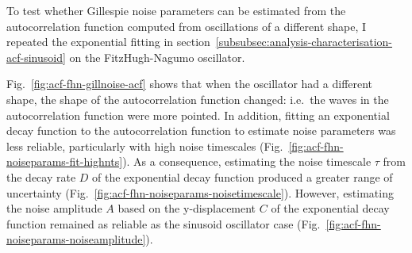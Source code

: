 To test whether Gillespie noise parameters can be estimated from the autocorrelation function computed from oscillations of a different shape, I repeated the exponential fitting in section~\ref{subsubsec:analysis-characterisation-acf-sinusoid} on the FitzHugh-Nagumo oscillator.

Fig.\ \ref{fig:acf-fhn-gillnoise-acf} shows that when the oscillator had a different shape, the shape of the autocorrelation function changed: i.e.\ the waves in the autocorrelation function were more pointed.
In addition, fitting an exponential decay function to the autocorrelation function to estimate noise parameters was less reliable, particularly with high noise timescales (Fig.\ \ref{fig:acf-fhn-noiseparams-fit-highnts}).
As a consequence, estimating the noise timescale $\tau$ from the decay rate $D$ of the exponential decay function produced a greater range of uncertainty (Fig.\ \ref{fig:acf-fhn-noiseparams-noisetimescale}).
However, estimating the noise amplitude $A$ based on the y-displacement $C$ of the exponential decay function remained as reliable as the sinusoid oscillator case (Fig.\ \ref{fig:acf-fhn-noiseparams-noiseamplitude}).


